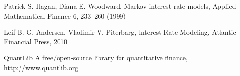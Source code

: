 \documentclass{amsart}
\theoremstyle{plain}
\numberwithin{equation}{section}
\begin{document}
\begin{thebibliography}{2}

 Patrick S. Hagan, Diana E. Woodward, Markov interest rate models, Applied Mathematical Finance 6, 233–260 (1999)

Leif B. G. Andersen, Vladimir V. Piterbarg, Interest Rate Modeling, Atlantic Financial Press, 2010

QuantLib A free/open-source library for quantitative finance, http://www.quantlib.org

\end{thebibliography}
\end{document}
